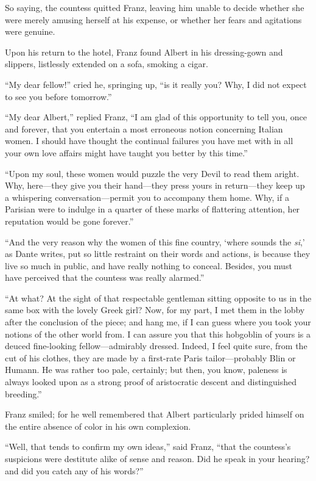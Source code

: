 So saying, the countess quitted Franz, leaving him unable to decide
whether she were merely amusing herself at his expense, or whether her
fears and agitations were genuine.

Upon his return to the hotel, Franz found Albert in his dressing-gown
and slippers, listlessly extended on a sofa, smoking a cigar.

“My dear fellow!” cried he, springing up, “is it really you? Why, I did
not expect to see you before tomorrow.”

“My dear Albert,” replied Franz, “I am glad of this opportunity to tell
you, once and forever, that you entertain a most erroneous notion
concerning Italian women. I should have thought the continual failures
you have met with in all your own love affairs might have taught you
better by this time.”

“Upon my soul, these women would puzzle the very Devil to read them
aright. Why, here—they give you their hand—they press yours in
return—they keep up a whispering conversation—permit you to accompany
them home. Why, if a Parisian were to indulge in a quarter of these
marks of flattering attention, her reputation would be gone forever.”

“And the very reason why the women of this fine country, ‘where sounds
the \textit{si},’ as Dante writes, put so little restraint on their words and
actions, is because they live so much in public, and have really
nothing to conceal. Besides, you must have perceived that the countess
was really alarmed.”

“At what? At the sight of that respectable gentleman sitting opposite
to us in the same box with the lovely Greek girl? Now, for my part, I
met them in the lobby after the conclusion of the piece; and hang me,
if I can guess where you took your notions of the other world from. I
can assure you that this hobgoblin of yours is a deuced fine-looking
fellow—admirably dressed. Indeed, I feel quite sure, from the cut of
his clothes, they are made by a first-rate Paris tailor—probably Blin
or Humann. He was rather too pale, certainly; but then, you know,
paleness is always looked upon as a strong proof of aristocratic
descent and distinguished breeding.”

Franz smiled; for he well remembered that Albert particularly prided
himself on the entire absence of color in his own complexion.

“Well, that tends to confirm my own ideas,” said Franz, “that the
countess’s suspicions were destitute alike of sense and reason. Did he
speak in your hearing? and did you catch any of his words?”

